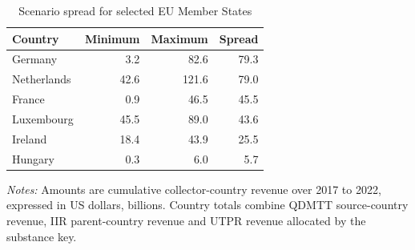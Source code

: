 \begin{table}[H]
\centering
\small
\caption[Scenario spread for selected EU Member States]{Scenario spread for selected EU Member States}
\label{tab:country_spread_updated}
\begin{tabular}{@{}lrrr@{}}
\toprule
Country & Minimum & Maximum & Spread \\
\midrule
Germany &  3.2 &  82.6 & 79.3 \\
Netherlands & 42.6 & 121.6 & 79.0 \\
France &  0.9 &  46.5 & 45.5 \\
Luxembourg & 45.5 &  89.0 & 43.6 \\
Ireland & 18.4 &  43.9 & 25.5 \\
Hungary &  0.3 &   6.0 &  5.7 \\
\bottomrule
\end{tabular}

\vspace{0.5em}
\begin{minipage}{0.96\textwidth}
\footnotesize\raggedright \textit{Notes:} Amounts are cumulative collector-country revenue over 2017 to 2022, expressed in US dollars, billions. Country totals combine QDMTT source-country revenue, IIR parent-country revenue and UTPR revenue allocated by the substance key.
\end{minipage}
\end{table}


